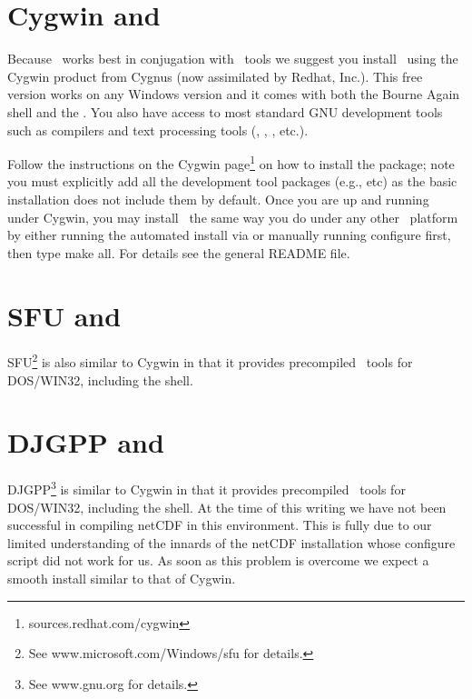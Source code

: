 \section{Cygwin and \gmt}

Because \GMT\ works best in conjugation with \UNIX\ tools we
suggest you install \GMT\ using the Cygwin product from
Cygnus (now assimilated by Redhat, Inc.).  This free version works on any Windows version
and it comes with both the Bourne Again shell  and the .
You also have access to most standard GNU development tools such
as compilers and text processing tools (,
, , etc.).

Follow the instructions on the Cygwin page\footnote{sources.redhat.com/cygwin} on how
to install the package; note you must explicitly add all the development tool
packages (e.g.,  etc) as the basic installation does not include them by default.
Once you are up and running under Cygwin, you may install \GMT\ 
the same way you do under any other \UNIX\ platform by either
running the automated install via  or manually
running configure first, then type make all.
For details see the general README file.


\section{SFU and \gmt}

SFU\footnote{See www.microsoft.com/Windows/sfu for details.} is also similar to Cygwin
in that it provides precompiled \UNIX\ tools for DOS/WIN32,
including the  shell.

\section{DJGPP and \gmt}

DJGPP\footnote{See www.gnu.org for details.} is similar to Cygwin
in that it provides precompiled \UNIX\ tools for DOS/WIN32,
including the  shell.  At the time of this writing we
have not been successful in compiling netCDF in this
environment.  This is fully due to our limited understanding
of the innards of the netCDF installation whose configure
script did not work for us.  As soon as this problem is
overcome we expect a smooth install similar to that of Cygwin.

